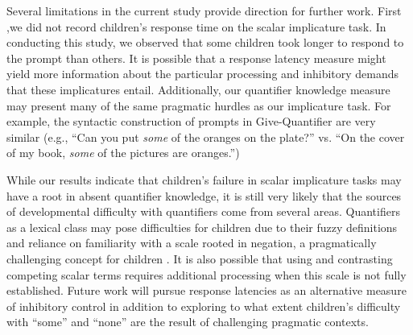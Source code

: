 \documentclass[man]{apa2}
\begin{document}
{%

Several limitations in the current study provide direction for further work. First ,we did not record children's response time on the scalar implicature task. In conducting this study, we observed that some children took longer to respond to the prompt than others. It is possible that a response latency measure might yield more information about the particular processing and inhibitory demands that these implicatures entail. Additionally, our quantifier knowledge measure \cite{barner2009} may present many of the same pragmatic hurdles as our implicature task. For example, the syntactic construction of prompts in Give-Quantifier are very similar (e.g., ``Can you put \emph{some} of the oranges on the plate?'' vs. ``On the cover of my book, \emph{some} of the pictures are oranges.'') 

While our results indicate that children's failure in scalar implicature tasks may have a root in absent quantifier knowledge, it is still very likely that the sources of developmental difficulty with quantifiers come from several areas. Quantifiers as a lexical class may pose difficulties for children due to their fuzzy definitions and reliance on familiarity with a scale rooted in negation, a pragmatically challenging concept for children \cite{nordmeyer2014}. It is also possible that using and contrasting competing scalar terms requires additional processing when this scale is not fully established. Future work will pursue response latencies as an alternative measure of inhibitory control in addition to exploring to what extent children's difficulty with ``some'' and ``none'' are the result of challenging pragmatic contexts. 

}
\end{document}
